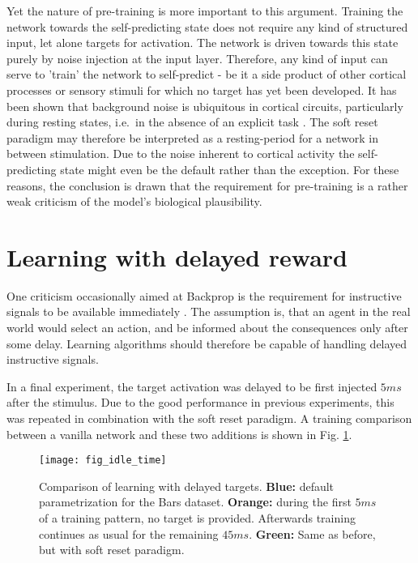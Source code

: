 Yet the nature of pre-training is more important to this argument. Training the network towards the self-predicting
state does not require any kind of structured input, let alone targets for activation. The network is driven towards
this state purely by noise injection at the input layer. Therefore, any kind of input can serve to 'train' the network
to self-predict - be it a side product of other cortical processes or sensory stimuli for which no target has yet been
developed. It has been shown that background noise is ubiquitous in cortical circuits, particularly during resting
states, i.e.\ in the absence of an explicit task \citep{Deco2009}. The soft reset paradigm may therefore be interpreted
as a resting-period for a network in between stimulation. Due to the noise inherent to cortical activity the
self-predicting state might even be the default rather than the exception. For these reasons, the conclusion is drawn
that the requirement for pre-training is a rather weak criticism of the model's biological plausibility.



\section{Learning with delayed reward}


One criticism occasionally aimed at Backprop is the requirement for instructive signals to be available immediately
\citep{Bartunov2018}. The assumption is, that an agent in the real world would select an action, and be informed about
the consequences only after some delay. Learning algorithms should therefore be capable of handling delayed instructive
signals.


In a final experiment, the target activation was delayed to be first injected $5ms$ after the stimulus. Due to the good
performance in previous experiments, this was repeated in combination with the soft reset paradigm. A training
comparison between a vanilla network and these two additions is shown in Fig. \ref{fig-idle-time}.


\begin{figure}[h]
    \centering
    \texttt{[image: fig\_idle\_time]}
    \caption[Comparison of learning with delayed targets.]{Comparison of learning with delayed targets. \textbf{Blue:}
        default parametrization for the Bars dataset. \textbf{Orange:} during the first $5ms$ of a training pattern, no
        target is provided. Afterwards training continues as usual for the remaining $45ms$. \textbf{Green:} Same as
        before, but with soft reset paradigm.}
    \label{fig-idle-time}
\end{figure}

